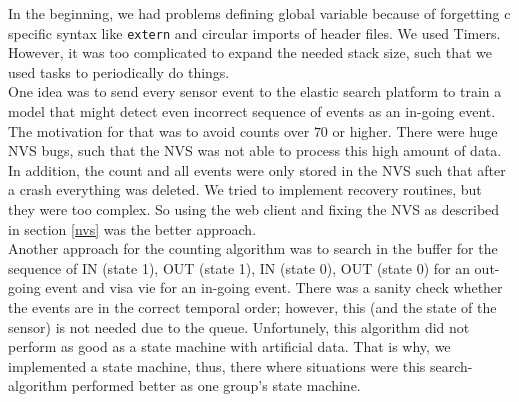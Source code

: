 In the beginning, we had problems defining global variable because of forgetting
c specific syntax like \verb!extern! and circular imports of header files.
We used Timers. However, it was too complicated to expand the needed stack size, such that
we used tasks to periodically do things. \\
One idea was to send every sensor event to the elastic search platform to train a model that
might detect even incorrect sequence of events as an in-going event. The motivation for that
was to avoid counts over $70$ or higher. There were huge NVS bugs, such that the
NVS was not able to process this high amount of data. In addition, the count and all events were only
stored in the NVS such that after a crash everything was deleted. We tried to implement
recovery routines, but they were too complex. So using the web client and fixing the
NVS as described in section \ref{nvs} was the better approach.\\
Another approach for the counting algorithm was to search in the buffer for the sequence of IN (state 1),
OUT (state 1), IN (state 0), OUT (state 0) for an out-going event and visa vie for an in-going event.
There was a sanity check whether the events are in the correct temporal order; however, this (and the state of the
sensor) is not needed due
to the queue. Unfortunely, this algorithm did not perform as good as a state machine with artificial data.
That is why, we implemented a state machine, thus, there where situations were this search-algorithm
performed better as one group's state machine.

